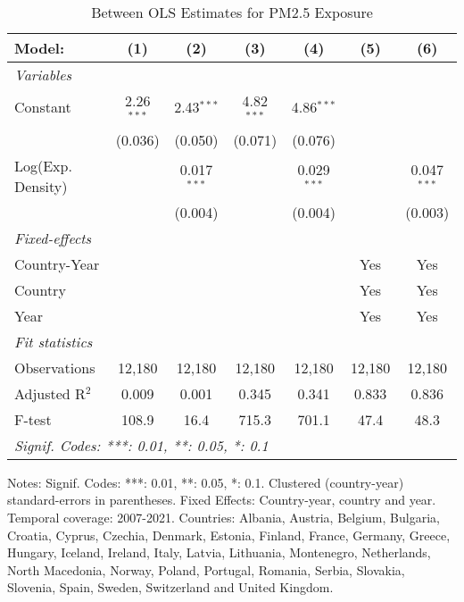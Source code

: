 
\begin{table}[htbp]
   \caption{\label{tab:ols_between} Between OLS Estimates for PM2.5 Exposure}
   \centering
   \small
   \begin{tabular}{lcccccc}
      \tabularnewline \midrule \midrule
      Model:            & (1)          & (2)           & (3)          & (4)           & (5)    & (6)\\  
      \midrule
      \emph{Variables}\\
      Constant          & 2.26$^{***}$ & 2.43$^{***}$  & 4.82$^{***}$ & 4.86$^{***}$  &        &   \\   
                        & (0.036)      & (0.050)       & (0.071)      & (0.076)       &        &   \\   
      Log(Exp. Density) &              & 0.017$^{***}$ &              & 0.029$^{***}$ &        & 0.047$^{***}$\\   
                        &              & (0.004)       &              & (0.004)       &        & (0.003)\\   
      \midrule
      \emph{Fixed-effects}\\
      Country-Year      &              &               &              &               & Yes    & Yes\\  
      Country           &              &               &              &               & Yes    & Yes\\  
      Year              &              &               &              &               & Yes    & Yes\\  
      \midrule
      \emph{Fit statistics}\\
      Observations      & 12,180       & 12,180        & 12,180       & 12,180        & 12,180 & 12,180\\  
      Adjusted R$^2$    & 0.009        & 0.001         & 0.345        & 0.341         & 0.833  & 0.836\\  
      F-test            & 108.9        & 16.4          & 715.3        & 701.1         & 47.4   & 48.3\\  
      \midrule \midrule
      \multicolumn{7}{l}{\emph{Signif. Codes: ***: 0.01, **: 0.05, *: 0.1}}\\
   \end{tabular}
   
   \par \raggedright 
   Notes: Signif. Codes: ***: 0.01, **: 0.05, *: 0.1. Clustered (country-year) standard-errors in parentheses. Fixed Effects: Country-year, country and year. Temporal coverage: 2007-2021. Countries: Albania, Austria, Belgium, Bulgaria, Croatia, Cyprus, Czechia, Denmark, Estonia, Finland, France, Germany, Greece, Hungary, Iceland, Ireland, Italy, Latvia, Lithuania, Montenegro, Netherlands, North Macedonia, Norway, Poland, Portugal, Romania, Serbia, Slovakia, Slovenia, Spain, Sweden, Switzerland and United Kingdom.
\end{table}



